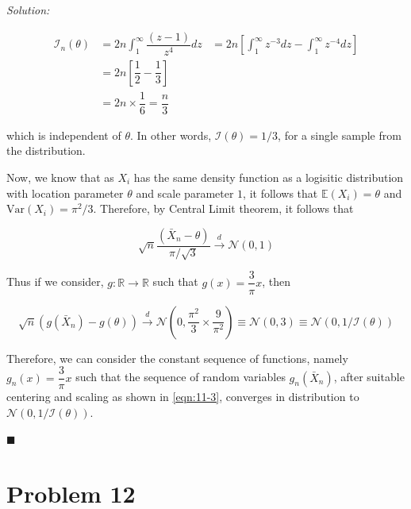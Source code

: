 \documentclass[12pt]{article}
\newcommand{\R}{\mathbb{R}}
\newcommand{\E}{\mathbb{E}}
\newcommand{\Var}{\text{Var}}
\newcommand{\normal}{\mathcal{N}}
\theoremstyle{definition}
\newenvironment{answer}{\textit{Solution: }\quad }{ \hfill $\blacksquare$}
\numberwithin{equation}{section}
\begin{document}
\begin{answer}
\begin{enumerate}
        \begin{align*}
            \mathcal{I}_n(\theta)
            & = 2n \int_{1}^{\infty} \dfrac{(z - 1)}{z^4} dz
            & = 2n \left[ \int_{1}^{\infty} z^{-3}dz - \int_{1}^{\infty} z^{-4}dz \right]\\
            & = 2n \left[ \dfrac{1}{2} - \dfrac{1}{3} \right]\\
            & = 2n \times \dfrac{1}{6} = \dfrac{n}{3}
        \end{align*}

        which is independent of $\theta$. In other words, $\mathcal{I}(\theta) = 1/3$, for a single sample from the distribution.

        Now, we know that as $X_i$ has the same density function as a logisitic distribution with location parameter $\theta$ and scale parameter $1$, it follows that $\E(X_i) = \theta$ and $\Var(X_i) = \pi^2/3$. Therefore, by Central Limit theorem, it follows that

        \begin{equation}
            \sqrt{n}\dfrac{(\bar{X}_n - \theta)}{\pi / \sqrt{3}} \xrightarrow{d} \normal(0, 1)
            \label{eqn:11-2}
        \end{equation}

        Thus if we consider, $g : \R \rightarrow \R$ such that $g(x) = \dfrac{3}{\pi} x$, then 

        \begin{equation}
            \sqrt{n}(g(\bar{X}_n) - g(\theta)) \xrightarrow{d} \normal\left(0, \dfrac{\pi^2}{3} \times \dfrac{9}{\pi^2} \right)
            \equiv \normal(0, 3) \equiv \normal\left( 0, 1/\mathcal{I}(\theta) \right)
            \label{eqn:11-3}
        \end{equation}

        Therefore, we can consider the constant sequence of functions, namely $g_n(x) = \dfrac{3}{\pi} x$ such that the sequence of random variables $g_n(\bar{X}_n)$, after suitable centering and scaling as shown in \cref{eqn:11-3}, converges in distribution to $\normal(0, 1/\mathcal{I}(\theta))$.

    \end{enumerate}

\end{answer}

\pagebreak
\section{Problem 12}
\end{document}
